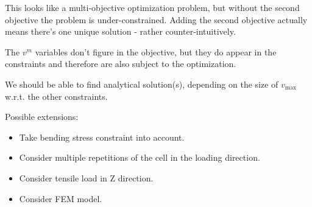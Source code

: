 This looks like a multi-objective optimization problem, but without the second objective the problem is under-constrained.
Adding the second objective actually means there's one unique solution - rather counter-intuitively.

The $v^m$ variables don't figure in the objective, but they do appear in the constraints and therefore are also subject to the optimization.

We should be able to find analytical solution(s), depending on the size of $v_\text{max}$ w.r.t. the other constraints.

Possible extensions:
\begin{itemize}
	\item Take bending stress constraint into account.
	\item Consider multiple repetitions of the cell in the loading direction.
	\item Consider tensile load in Z direction.
	\item Consider FEM model.
\end{itemize}

